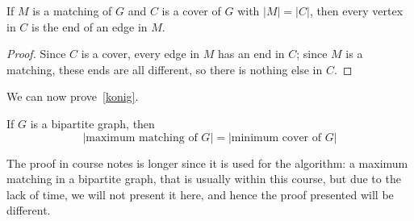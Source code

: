 \begin{thmbox}
    \begin{prop}\label{equality matching}
        If $ M $ is a matching of $ G $ and $ C $ is a cover of $ G $ with $ |M|=|C| $,
        then every vertex in $ C $ is the end of an edge in $ M $.
    \end{prop}
\end{thmbox}
\begin{proof}
    Since $ C $ is a cover, every edge in $ M $ has an end in $ C $; since $ M $
    is a matching, these ends are all different, so there is nothing else in $ C $.
\end{proof}
We can now prove~\ref{konig}.
\begin{thmbox}
    \begin{theorem}
        If $ G $ is a bipartite graph, then
        \[ |\text{maximum matching of }G|=|\text{minimum cover of }G| \]
    \end{theorem}
\end{thmbox}
The proof in course notes is longer since it is used for the algorithm:
a maximum matching in a bipartite graph, that is usually within this course,
but due to the lack of time, we will not present it here, and hence the proof presented
will be different.
